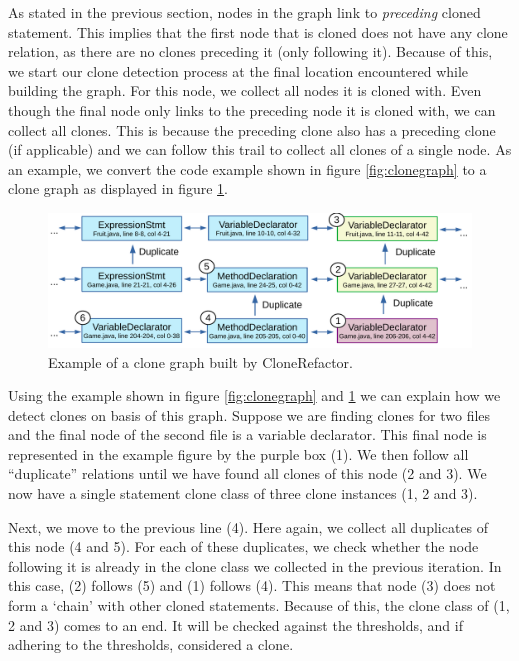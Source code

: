 As stated in the previous section, nodes in the graph link to \textit{preceding} cloned statement. This implies that the first node that is cloned does not have any clone relation, as there are no clones preceding it (only following it). Because of this, we start our clone detection process at the final location encountered while building the graph. For this node, we collect all nodes it is cloned with. Even though the final node only links to the preceding node it is cloned with, we can collect all clones. This is because the preceding clone also has a preceding clone (if applicable) and we can follow this trail to collect all clones of a single node. As an example, we convert the code example shown in figure \ref{fig:clonegraph} to a clone graph as displayed in figure \ref{fig:clonegraph2}.

\begin{figure}[H]
  \centering
  \includegraphics[width=1\columnwidth]{img/CodeGraphExample}
  \caption{Example of a clone graph built by CloneRefactor.}
  \label{fig:clonegraph2}
\end{figure}

Using the example shown in figure \ref{fig:clonegraph} and \ref{fig:clonegraph2} we can explain how we detect clones on basis of this graph. Suppose we are finding clones for two files and the final node of the second file is a variable declarator. This final node is represented in the example figure by the purple box (1). We then follow all ``duplicate'' relations until we have found all clones of this node (2 and 3). We now have a single statement clone class of three clone instances (1, 2 and 3).

Next, we move to the previous line (4). Here again, we collect all duplicates of this node (4 and 5). For each of these duplicates, we check whether the node following it is already in the clone class we collected in the previous iteration. In this case, (2) follows (5) and (1) follows (4). This means that node (3) does not form a `chain' with other cloned statements. Because of this, the clone class of (1, 2 and 3) comes to an end. It will be checked against the thresholds, and if adhering to the thresholds, considered a clone.

